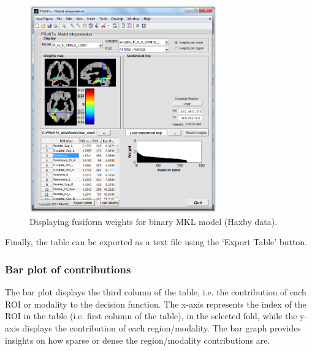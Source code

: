 \begin{figure}[h!]
\begin{center}
\includegraphics[height=9cm]{images/prt_ui_weights_specROI.PNG}
\caption{Displaying fusiform weights for binary MKL model (Haxby data).}
\label{fig_prt_ui_weights_specROI}
\end{center}
\end{figure}


Finally, the table can be exported as a text file using the `Export Table' button.

\subsubsection{Bar plot of contributions}
The bar plot displays the third column of the table, i.e. the contribution of each ROI or modality to the decision function. The x-axis represents the index of the ROI in the table (i.e. first column of the table), in the selected fold, while the y-axis displays the contribution of each region/modality. The bar graph provides insights on how sparse or dense the region/modality contributions are.




